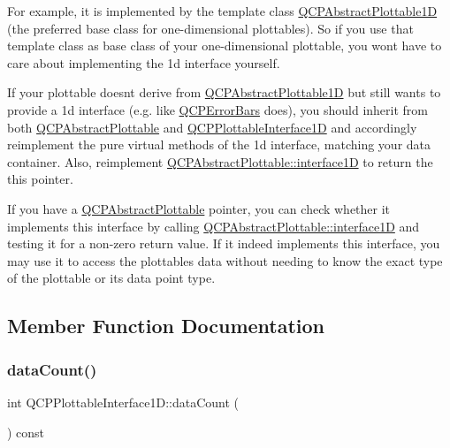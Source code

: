 For example, it is implemented by the template class \hyperlink{classQCPAbstractPlottable1D}{Q\+C\+P\+Abstract\+Plottable1D} (the preferred base class for one-\/dimensional plottables). So if you use that template class as base class of your one-\/dimensional plottable, you won\textquotesingle{}t have to care about implementing the 1d interface yourself.

If your plottable doesn\textquotesingle{}t derive from \hyperlink{classQCPAbstractPlottable1D}{Q\+C\+P\+Abstract\+Plottable1D} but still wants to provide a 1d interface (e.\+g. like \hyperlink{classQCPErrorBars}{Q\+C\+P\+Error\+Bars} does), you should inherit from both \hyperlink{classQCPAbstractPlottable}{Q\+C\+P\+Abstract\+Plottable} and \hyperlink{classQCPPlottableInterface1D}{Q\+C\+P\+Plottable\+Interface1D} and accordingly reimplement the pure virtual methods of the 1d interface, matching your data container. Also, reimplement \hyperlink{classQCPAbstractPlottable_a81fd9fd5c4f429c074785e2eb238a8e7}{Q\+C\+P\+Abstract\+Plottable\+::interface1D} to return the {\ttfamily this} pointer.

If you have a \hyperlink{classQCPAbstractPlottable}{Q\+C\+P\+Abstract\+Plottable} pointer, you can check whether it implements this interface by calling \hyperlink{classQCPAbstractPlottable_a81fd9fd5c4f429c074785e2eb238a8e7}{Q\+C\+P\+Abstract\+Plottable\+::interface1D} and testing it for a non-\/zero return value. If it indeed implements this interface, you may use it to access the plottable\textquotesingle{}s data without needing to know the exact type of the plottable or its data point type. 

\subsection{Member Function Documentation}
\mbox{\label{classQCPPlottableInterface1D_a058a22c770ef4d5a0e878a7f02183da9}} 
\subsubsection{\texorpdfstring{data\+Count()}{dataCount()}}
{\footnotesize\ttfamily int Q\+C\+P\+Plottable\+Interface1\+D\+::data\+Count (\begin{DoxyParamCaption}{ }\end{DoxyParamCaption}) const\hspace{0.3cm}{\ttfamily [pure virtual]}}

